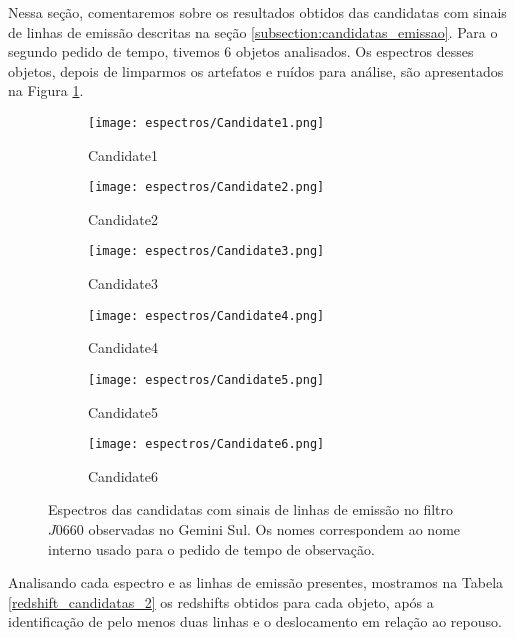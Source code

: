 Nessa seção, comentaremos sobre os resultados obtidos das candidatas com sinais de linhas de emissão descritas na seção \ref{subsection:candidatas_emissao}. Para o segundo pedido de tempo, tivemos 6 objetos analisados. Os espectros desses objetos, depois de limparmos os artefatos e ruídos para análise, são apresentados na Figura \ref{espectros_candidatas_2}.

\begin{figure}[!ht]
    \centering
    \captionsetup{justification=centering}
    \begin{subfigure}[b]{0.45\textwidth}
        \texttt{[image: espectros/Candidate1.png]}
        \caption{Candidate1}
    \end{subfigure}
    \begin{subfigure}[b]{0.45\textwidth}
        \texttt{[image: espectros/Candidate2.png]}
        \caption{Candidate2}
    \end{subfigure}
    \begin{subfigure}[b]{0.45\textwidth}
        \texttt{[image: espectros/Candidate3.png]}
        \caption{Candidate3}
    \end{subfigure}
    \begin{subfigure}[b]{0.45\textwidth}
        \texttt{[image: espectros/Candidate4.png]}
        \caption{Candidate4}
    \end{subfigure}
    \begin{subfigure}[b]{0.45\textwidth}
        \texttt{[image: espectros/Candidate5.png]}
        \caption{Candidate5}
    \end{subfigure}
    \begin{subfigure}[b]{0.45\textwidth}
        \texttt{[image: espectros/Candidate6.png]}
        \caption{Candidate6}
    \end{subfigure}
    \caption{Espectros das candidatas com sinais de linhas de emissão no filtro $J0660$ observadas no Gemini Sul. Os nomes correspondem ao nome interno usado para o pedido de tempo de observação.}
    \label{espectros_candidatas_2}
\end{figure}

Analisando cada espectro e as linhas de emissão presentes, mostramos na Tabela \ref{redshift_candidatas_2} os redshifts obtidos para cada objeto, após a identificação de pelo menos duas linhas e o deslocamento em relação ao repouso.

